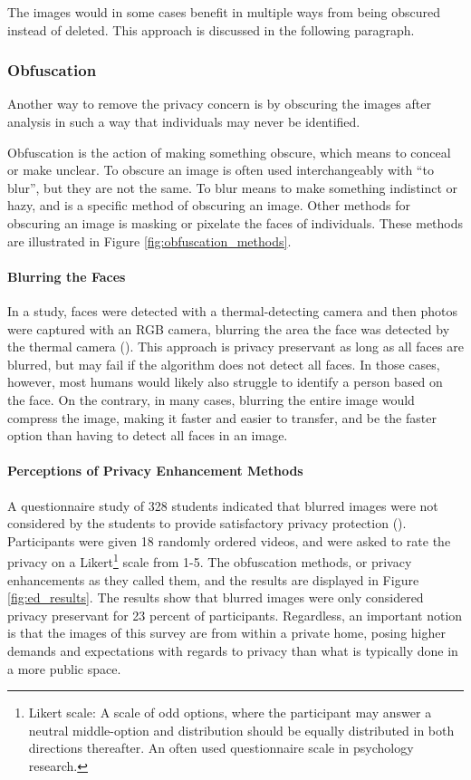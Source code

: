 The images would in some cases benefit in multiple ways from being obscured instead of deleted. This approach is discussed in the following paragraph.

\subsubsection{Obfuscation}
\label{sec:obfuscation}
Another way to remove the privacy concern is by obscuring the images after analysis in such a way that individuals may never be identified.

Obfuscation is the action of making something obscure, which means to conceal or make unclear. To obscure an image is often used interchangeably with “to blur”, but they are not the same. To blur means to make something indistinct or hazy, and is a specific method of obscuring an image. Other methods for obscuring an image is masking or pixelate the faces of individuals. These methods are illustrated in Figure \ref{fig:obfuscation_methods}.

\paragraph{Blurring the Faces}
In a \citeyear{ma2019fall_anonymous} study, faces were detected with a thermal-detecting camera and then photos were captured with an RGB camera, blurring the area the face was detected by the thermal camera (\citeauthor{ma2019fall_anonymous}). This approach is privacy preservant as long as all faces are blurred, but may fail if the algorithm does not detect all faces. In those cases, however, most humans would likely also struggle to identify a person based on the face. On the contrary, in many cases, blurring the entire image would compress the image, making it faster and easier to transfer, and be the faster option than having to detect all faces in an image.

\paragraph{Perceptions of Privacy Enhancement Methods}
A questionnaire study of 328 students indicated that blurred images were not considered by the students to provide satisfactory privacy protection (\cite{ed2012privacy_review}). Participants were given 18 randomly ordered videos, and were asked to rate the privacy on a Likert\footnote{Likert scale: A scale of odd options, where the participant may answer a neutral middle-option and distribution should be equally distributed in both directions thereafter. An often used questionnaire scale in psychology research.} scale from 1-5. The obfuscation methods, or privacy enhancements as they called them, and the results are displayed in Figure \ref{fig:ed_results}. The results show that blurred images were only considered privacy preservant for 23 percent of participants. Regardless, an important notion is that the images of this survey are from within a private home, posing higher demands and expectations with regards to privacy than what is typically done in a more public space.

